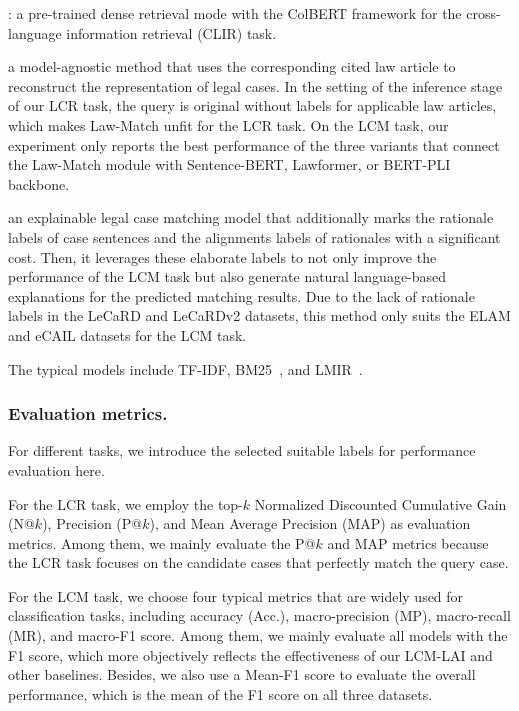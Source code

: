 : a pre-trained dense retrieval mode with the ColBERT framework for the cross-language information retrieval (CLIR) task.

 a model-agnostic method that uses the corresponding cited law article to reconstruct the representation of legal cases.
In the setting of the inference stage of our LCR task, the query is original without labels for applicable law articles, which makes Law-Match unfit for the LCR task. 
On the LCM task, our experiment only reports the best performance of the three variants that connect the Law-Match module with Sentence-BERT, Lawformer, or BERT-PLI backbone.

 an explainable legal case matching model that additionally marks the rationale labels of case sentences and the alignments labels of rationales with a significant cost. Then, it leverages these elaborate labels to not only improve the performance of the LCM task but also generate natural language-based explanations for the predicted matching results. 
Due to the lack of rationale labels in the LeCaRD and LeCaRDv2 datasets, this method only suits the ELAM and eCAIL datasets for the LCM task. 

 The typical models include TF-IDF, BM25~\cite{robertson1994BM25}, and LMIR~\cite{song1999LMIR}.

\subsubsection{Evaluation metrics.} For different tasks, we introduce the selected suitable labels for performance evaluation here.

For the LCR task, we employ the top-$k$ Normalized Discounted Cumulative Gain (N@$k$), Precision (P@$k$), and Mean Average Precision (MAP) as evaluation metrics. Among them, we mainly evaluate the P@$k$ and MAP metrics because the LCR task focuses on the candidate cases that perfectly match the query case.

For the LCM task, we choose four typical metrics that are widely used for classification tasks, including accuracy (Acc.), macro-precision (MP), macro-recall (MR), and macro-F1 score. 
Among them, we mainly evaluate all models with the F1 score, which more objectively reflects the effectiveness of our LCM-LAI and other baselines. 
Besides, we also use a Mean-F1 score to evaluate the overall performance, which is the mean of the F1 score on all three datasets.



